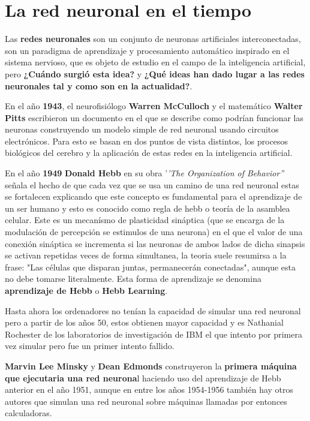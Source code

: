 \documentclass[a4paper, 11pt]{article} %
\begin{document}
\section{La red neuronal en el tiempo}
Las \textbf{redes neuronales} son un conjunto de neuronas artificiales interconectadas, son un paradigma de aprendizaje y procesamiento automático inspirado en el sistema nervioso, que es objeto de estudio en el campo de la inteligencia artificial, pero \textbf{¿Cuándo surgió esta idea?} y \textbf{¿Qué ideas han dado lugar a las redes neuronales tal y como son en la actualidad?}.

En el año \textbf{1943}, el neurofisiólogo \textbf{Warren McCulloch} y el matemático \textbf{Walter Pitts} escribieron un documento en el que se describe como podrían funcionar las neuronas construyendo un modelo simple de red neuronal usando circuitos electrónicos. Para esto se basan en dos puntos de vista distintos, los procesos biológicos del cerebro y la aplicación de estas redes en la inteligencia artificial.

En el año \textbf{1949} \textbf{Donald Hebb} en su obra '\textit{'The Organization of Behavior''} señala el hecho de que cada vez que se usa un camino de una red neuronal estas se fortalecen explicando que este concepto es fundamental para el aprendizaje de un ser humano y esto es conocido como regla de hebb o teoría de la asamblea celular. Este es un mecanísmo de plasticidad sináptica (que se encarga de la modulación de percepción se estimulos de una neurona) en el que el valor de una conexión sináptica se incrementa si las neuronas de ambos lados de dicha sinapsis se activan repetidas veces de forma simultanea, la teoria suele resumirsa a la frase: "Las células que disparan juntas, permanecerán conectadas", aunque esta no debe tomarse literalmente. Esta forma de aprendizaje se denomina \textbf{aprendizaje de Hebb} o \textbf{Hebb Learning}.

Hasta ahora los ordenadores no tenían la capacidad de simular una red neuronal pero a partir de los años 50, estos obtienen mayor capacidad y es Nathanial Rochester de los laboratorios de investigación de IBM el que intento por primera vez simular pero fue un primer intento fallido.

\textbf{Marvin Lee Minsky} y \textbf{Dean Edmonds} construyeron la \textbf{primera máquina que ejecutaria una red neurona}l haciendo uso del aprendizaje de Hebb anterior en el año 1951, aunque en entre los años 1954-1956 también hay otros autores que simulan una red neuronal sobre máquinas llamadas por entonces calculadoras.
\end{document}
